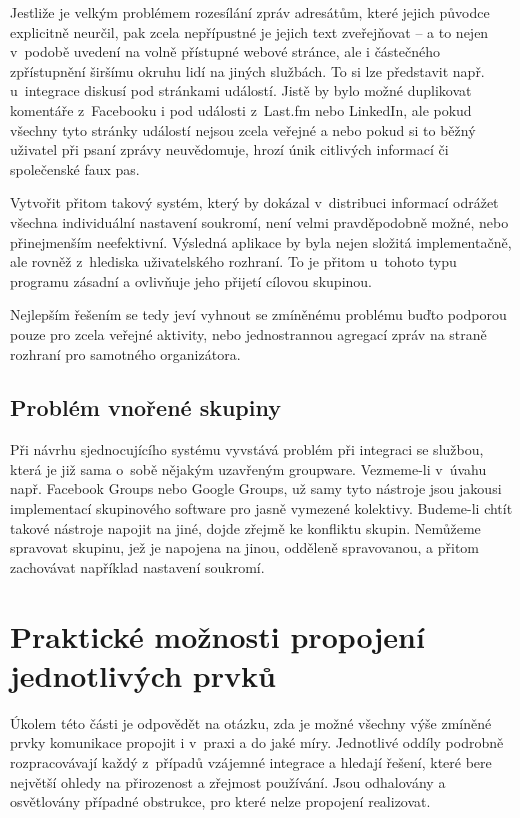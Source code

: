 \documentclass[12pt,oneside,final]{fithesis2}
\begin{document}
Jestliže je velkým problémem rozesílání zpráv adresátům, které jejich původce explicitně neurčil, pak zcela nepřípustné je jejich text zveřejňovat -- a to nejen v~podobě uvedení na volně přístupné webové stránce, ale i částečného zpřístupnění širšímu okruhu lidí na jiných službách. To si lze představit např. u~integrace diskusí pod stránkami událostí. Jistě by bylo možné duplikovat komentáře z~Facebooku i pod události z~Last.fm nebo LinkedIn, ale pokud všechny tyto stránky událostí nejsou zcela veřejné a nebo pokud si to běžný uživatel při psaní zprávy neuvědomuje, hrozí únik citlivých informací či společenské faux pas.

Vytvořit přitom takový systém, který by dokázal v~distribuci informací odrážet všechna individuální nastavení soukromí, není velmi pravděpodobně možné, nebo přinejmenším neefektivní. Výsledná aplikace by byla nejen složitá implementačně, ale rovněž z~hlediska uživatelského rozhraní. To je přitom u~tohoto typu programu zásadní a ovlivňuje jeho přijetí cílovou skupinou.

Nejlepším řešením se tedy jeví vyhnout se zmíněnému problému buďto podporou pouze pro zcela veřejné aktivity, nebo jednostrannou agregací zpráv na straně rozhraní pro samotného organizátora.

\subsection{Problém vnořené skupiny}\label{innerGroup}
Při návrhu sjednocujícího systému vyvstává problém při integraci se službou, která je již sama o~sobě nějakým uzavřeným groupware. Vezmeme-li v~úvahu např. Facebook Groups nebo Google Groups, už samy tyto nástroje jsou jakousi implementací skupinového software pro jasně vymezené kolektivy. Budeme-li chtít takové nástroje napojit na jiné, dojde zřejmě ke konfliktu skupin. Nemůžeme spravovat skupinu, jež je napojena na jinou, odděleně spravovanou, a přitom zachovávat například nastavení soukromí.


\section{Praktické možnosti propojení jednotlivých prvků}\label{practicalOptions}
Úkolem této části je odpovědět na otázku, zda je možné všechny výše zmíněné prvky komunikace propojit i v~praxi a do jaké míry. Jednotlivé oddíly podrobně rozpracovávají každý z~případů vzájemné integrace a hledají řešení, které bere největší ohledy na přirozenost a zřejmost používání. Jsou odhalovány a osvětlovány případné obstrukce, pro které nelze propojení realizovat.
\end{document}
